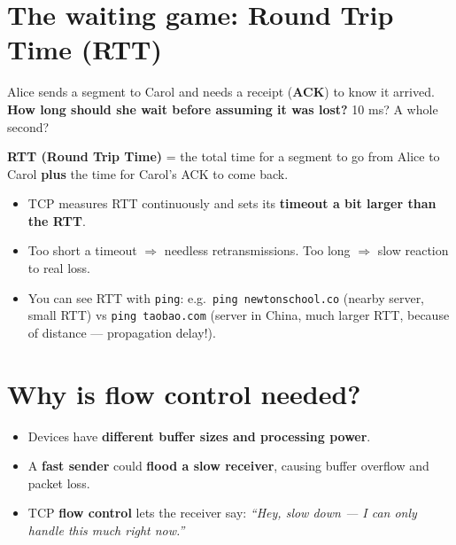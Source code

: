 \section{The waiting game: Round Trip Time (RTT)}
Alice sends a segment to Carol and needs a receipt (\textbf{ACK}) to know it arrived. \textbf{How long should she wait before assuming it was lost?} 10 ms? A whole second?

\textbf{RTT (Round Trip Time)} = the total time for a segment to go from Alice to Carol \textbf{plus} the time for Carol's ACK to come back.
\begin{itemize}
  \item TCP measures RTT continuously and sets its \textbf{timeout a bit larger than the RTT}.
  \item Too short a timeout $\Rightarrow$ needless retransmissions. Too long $\Rightarrow$ slow reaction to real loss.
  \item You can see RTT with \texttt{ping}: e.g.\ \texttt{ping newtonschool.co} (nearby server, small RTT) vs \texttt{ping taobao.com} (server in China, much larger RTT, because of distance --- propagation delay!).
\end{itemize}

\begin{center}
\end{center}

\section{Why is flow control needed?}
\begin{itemize}
  \item Devices have \textbf{different buffer sizes and processing power}.
  \item A \textbf{fast sender} could \textbf{flood a slow receiver}, causing buffer overflow and packet loss.
  \item TCP \textbf{flow control} lets the receiver say: \emph{``Hey, slow down --- I can only handle this much right now.''}
\end{itemize}

